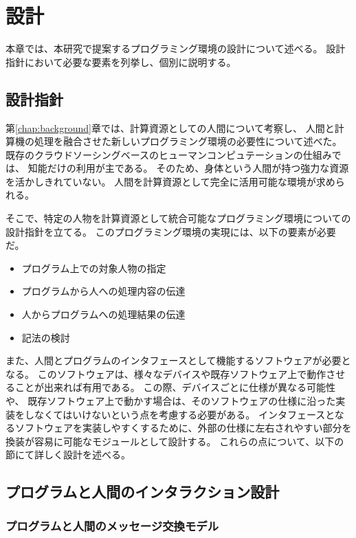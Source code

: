 \chapter{設計}\label{chap:design}

本章では、本研究で提案するプログラミング環境の設計について述べる。
設計指針において必要な要素を列挙し、個別に説明する。

\section{設計指針}\label{ux8a2dux8a08ux6307ux91dd}

第\ref{chap:background}章では、計算資源としての人間について考察し、
人間と計算機の処理を融合させた新しいプログラミング環境の必要性について述べた。
既存のクラウドソーシングベースのヒューマンコンピュテーションの仕組みでは、
知能だけの利用が主である。
そのため、身体という人間が持つ強力な資源を活かしきれていない。
人間を計算資源として完全に活用可能な環境が求められる。

そこで、特定の人物を計算資源として統合可能なプログラミング環境についての設計指針を立てる。
このプログラミング環境の実現には、以下の要素が必要だ。

\begin{itemize}
\itemsep1pt\parskip0pt
\item
  プログラム上での対象人物の指定
\item
  プログラムから人への処理内容の伝達
\item
  人からプログラムへの処理結果の伝達
\item
  記法の検討
\end{itemize}

また、人間とプログラムのインタフェースとして機能するソフトウェアが必要となる。
このソフトウェアは、様々なデバイスや既存ソフトウェア上で動作させることが出来れば有用である。
この際、デバイスごとに仕様が異なる可能性や、
既存ソフトウェア上で動かす場合は、そのソフトウェアの仕様に沿った実装をしなくてはいけないという点を考慮する必要がある。
インタフェースとなるソフトウェアを実装しやすくするために、外部の仕様に左右されやすい部分を
換装が容易に可能なモジュールとして設計する。
これらの点について、以下の節にて詳しく設計を述べる。

\section{プログラムと人間のインタラクション設計}\label{sec:program-human-interaction-design}

\subsection{プログラムと人間のメッセージ交換モデル}\label{ux30d7ux30edux30b0ux30e9ux30e0ux3068ux4ebaux9593ux306eux30e1ux30c3ux30bbux30fcux30b8ux4ea4ux63dbux30e2ux30c7ux30eb}

